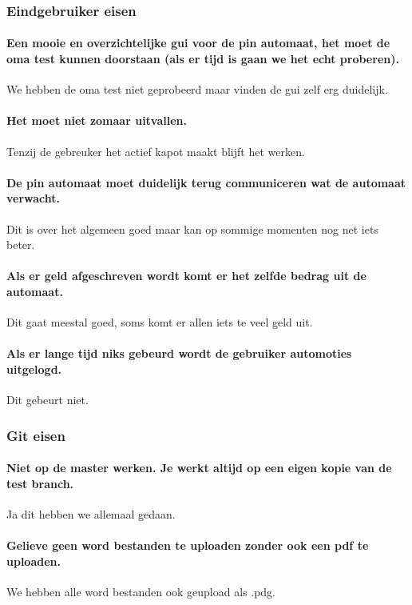 \documentclass{article}
\begin{document}
\subsubsection{Eindgebruiker eisen}

	\paragraph{Een mooie en overzichtelijke gui voor de pin automaat, het moet de oma test kunnen doorstaan (als er tijd is gaan we het echt proberen).}
We hebben de oma test niet geprobeerd maar vinden de gui zelf erg duidelijk.
	\paragraph{Het moet niet zomaar uitvallen.}
Tenzij de gebreuker het actief kapot maakt blijft het werken.
	\paragraph{De pin automaat moet duidelijk terug communiceren wat de automaat verwacht.}
Dit is over het algemeen goed maar kan op sommige momenten nog net iets beter.
	\paragraph{Als er geld afgeschreven wordt komt er het zelfde bedrag uit de automaat.}
Dit gaat meestal goed, soms komt er allen iets te veel geld uit.
	\paragraph{Als er lange tijd niks gebeurd wordt de gebruiker automoties uitgelogd.}
Dit gebeurt niet.

\subsubsection{Git eisen}

	\paragraph{Niet op de master werken. Je werkt altijd op een eigen kopie van de test branch.}
Ja dit hebben we allemaal gedaan.
	\paragraph{Gelieve geen word bestanden te uploaden zonder ook een pdf te uploaden.}
We hebben alle word bestanden ook geupload als .pdg.
\end{document}
